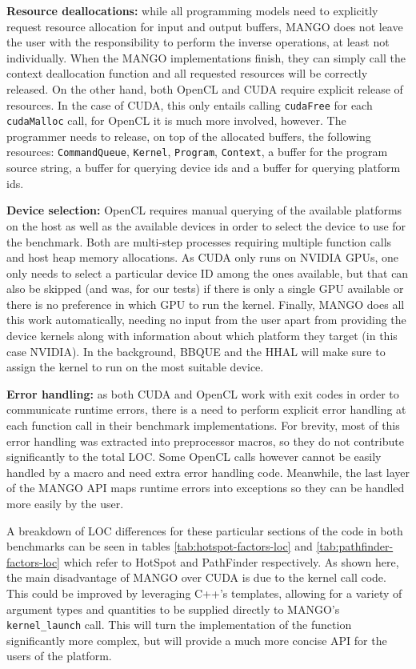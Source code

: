 \textbf{Resource deallocations:} while all programming models need to explicitly request resource allocation for input and output buffers, MANGO does not leave the user with the responsibility to perform the inverse operations, at least not individually. When the MANGO implementations finish, they can simply call the context deallocation function and all requested resources will be correctly released. On the other hand, both OpenCL and CUDA require explicit release of resources. In the case of CUDA, this only entails calling \texttt{cudaFree} for each \texttt{cudaMalloc} call, for OpenCL it is much more involved, however. The programmer needs to release, on top of the allocated buffers, the following resources: \texttt{CommandQueue}, \texttt{Kernel}, \texttt{Program}, \texttt{Context}, a buffer for the program source string, a buffer for querying device ids and a buffer for querying platform ids.

\textbf{Device selection:} OpenCL requires manual querying of the available platforms on the host as well as the available devices in order to select the device to use for the benchmark. Both are multi-step processes requiring multiple function calls and host heap memory allocations. As CUDA only runs on NVIDIA GPUs, one only needs to select a particular device ID among the ones available, but that can also be skipped (and was, for our tests) if there is only a single GPU available or there is no preference in which GPU to run the kernel. Finally, MANGO does all this work automatically, needing no input from the user apart from providing the device kernels along with information about which platform they target (in this case NVIDIA). In the background, BBQUE and the HHAL will make sure to assign the kernel to run on the most suitable device.

\textbf{Error handling:} as both CUDA and OpenCL work with exit codes in order to communicate runtime errors, there is a need to perform explicit error handling at each function call in their benchmark implementations. For brevity, most of this error handling was extracted into preprocessor macros, so they do not contribute significantly to the total LOC. Some OpenCL calls however cannot be easily handled by a macro and need extra error handling code. Meanwhile, the last layer of the MANGO API maps runtime errors into exceptions so they can be handled more easily by the user.

A breakdown of LOC differences for these particular sections of the code in both benchmarks can be seen in tables \ref{tab:hotspot-factors-loc} and \ref{tab:pathfinder-factors-loc} which refer to HotSpot and PathFinder respectively. As shown here, the main disadvantage of MANGO over CUDA is due to the kernel call code. This could be improved by leveraging C++'s templates, allowing for a variety of argument types and quantities to be supplied directly to MANGO's \texttt{kernel\_launch} call. This will turn the implementation of the function significantly more complex, but will provide a much more concise API for the users of the platform.

